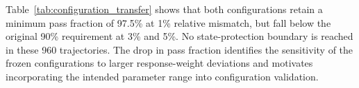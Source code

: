 Table~\ref{tab:configuration_transfer} shows that both configurations retain a minimum pass fraction of 97.5\% at 1\% relative mismatch, but fall below the original 90\% requirement at 3\% and 5\%. No state-protection boundary is reached in these 960 trajectories. The drop in pass fraction identifies the sensitivity of the frozen configurations to larger response-weight deviations and motivates incorporating the intended parameter range into configuration validation.

